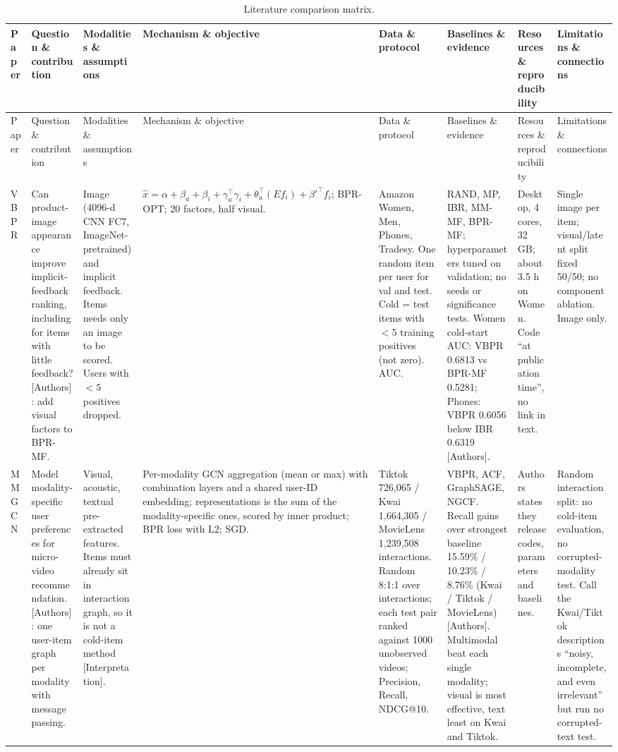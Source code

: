\documentclass[conference]{IEEEtran}
\begin{document}
\begingroup\centering\scriptsize\setlength{\tabcolsep}{2pt}
\renewcommand{\arraystretch}{1.0}
\begin{longtable}{@{}p{1.6cm}*{7}{>{\raggedright\arraybackslash}p{2.2cm}}@{}}
\caption{Literature comparison matrix.}\label{tab:matrix}\\
\toprule
Paper & Question \& contribution & Modalities \& assumptions & Mechanism \& objective & Data \& protocol & Baselines \& evidence & Resources \& reproducibility & Limitations \& connections \\
\midrule
\endfirsthead
\toprule
Paper & Question \& contribution & Modalities \& assumptions & Mechanism \& objective & Data \& protocol & Baselines \& evidence & Resources \& reproducibility & Limitations \& connections \\
\midrule
\endhead
\bottomrule
\endfoot
VBPR~\cite{he2016vbpr} & Can product-image appearance improve implicit-feedback ranking, including for items with little feedback? [Authors]: add visual factors to BPR-MF. & Image (4096-d CNN FC7, ImageNet-pretrained) and implicit feedback. Items needs only an image to be scored. Users with $<5$ positives dropped. & $\hat{x} = \alpha + \beta_u + \beta_i + \gamma_u^{\top}\gamma_i + \theta_u^{\top}(E f_i) + \beta'^{\top} f_i$; BPR-OPT; 20 factors, half visual. & Amazon Women, Men, Phones, Tradesy. One random item per user for val and test. Cold = test items with $<5$ training positives (not zero). AUC. & RAND, MP, IBR, MM-MF, BPR-MF; hyperparameters tuned on validation; no seeds or significance tests. Women cold-start AUC: VBPR 0.6813 vs BPR-MF 0.5281; Phones: VBPR 0.6056 below IBR 0.6319 [Authors]. & Desktop, 4 cores, 32 GB; about 3.5 h on Women. Code ``at publication time'', no link in text. & Single image per item; visual/latent split fixed 50/50; no component ablation. Image only. \\
\midrule
MMGCN~\cite{wei2019mmgcn} & Model modality-specific user preferences for micro-video recommendation. [Authors]: one user-item graph per modality with message passing. & Visual, acoustic, textual pre-extracted features. Items must already sit in interaction graph, so it is not a cold-item method [Interpretation]. & Per-modality GCN aggregation (mean or max) with combination layers and a shared user-ID embedding; representations is the sum of the modality-specific ones, scored by inner product; BPR loss with L2; SGD. & Tiktok 726,065 / Kwai 1,664,305 / MovieLens 1,239,508 interactions. Random 8:1:1 over interactions; each test pair ranked against 1000 unobserved videos; Precision, Recall, NDCG@10. & VBPR, ACF, GraphSAGE, NGCF. Recall gains over strongest baseline 15.59\% / 10.23\% / 8.76\% (Kwai / Tiktok / MovieLens) [Authors]. Multimodal beat each single modality; visual is most effective, text least on Kwai and Tiktok. & Authors states they release codes, parameters and baselines. & Random interaction split: no cold-item evaluation, no corrupted-modality test. Call the Kwai/Tiktok descriptions ``noisy, incomplete, and even irrelevant'' but run no corrupted-text test. \\

\end{longtable}
\end{document}
